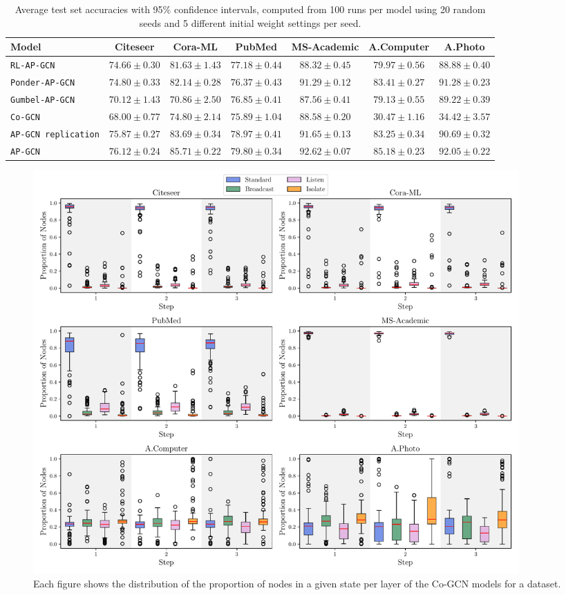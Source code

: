 \documentclass{gdl}
\begin{document}
\newpage
\onecolumn

\begin{table}[h]
    \small\sf\centering
    \caption{Average test set accuracies with 95\% confidence intervals, computed from 100 runs per model using 20 random seeds and 5 different initial weight settings per seed.}
    \begin{tabular}{l c c c c c c}
        \toprule
        Model & Citeseer & Cora-ML & PubMed & MS-Academic & A.Computer & A.Photo\\
        \midrule
        \texttt{RL-AP-GCN} &$74.66 \pm 0.30$&$81.63 \pm 1.43$&$77.18 \pm 0.44$&$88.32 \pm 0.45$&$79.97 \pm 0.56$&$88.88 \pm 0.40$   \\
        \texttt{Ponder-AP-GCN} &$74.80 \pm 0.33$&$82.14 \pm 0.28$&$76.37 \pm 0.43$&$91.29 \pm 0.12$&$83.41 \pm 0.27$&$91.28 \pm 0.23$  \\
        \texttt{Gumbel-AP-GCN} &$70.12 \pm 1.43$&$70.86 \pm 2.50$&$76.85 \pm 0.41$&$87.56 \pm 0.41$&$79.13 \pm 0.55$&$89.22 \pm 0.39$  \\
        \texttt{Co-GCN} &$68.00 \pm 0.77$&$74.80 \pm 2.14$&$75.89 \pm 1.04$&$88.58 \pm 0.20$&$30.47 \pm 1.16$&$34.42 \pm 3.57$  \\
        \texttt{AP-GCN replication} &$75.87 \pm 0.27$&$83.69 \pm 0.34$&$78.97 \pm 0.41$&$91.65 \pm 0.13$&$83.25 \pm 0.34$&$90.69 \pm 0.32$        \\
        \midrule
        \texttt{AP-GCN} & $76.12 \pm 0.24$ & $85.71 \pm 0.22$ & $79.80 \pm 0.34$ & $92.62 \pm 0.07$ & $85.18 \pm 0.23$ & $92.05 \pm 0.22$\\
        \bottomrule
    \end{tabular}
    \label{tab:accuracy}
\end{table}

\begin{figure}[h]
    \centering 
        \includegraphics[width=0.9\textwidth]{Cooperative-AP-GCN_state_distribution_per_step.pdf}
        \caption{Each figure shows the distribution of the proportion of nodes in a given state per layer of the Co-GCN models for a dataset.}
        \label{fig:cooperative-result} 
\end{figure}
\end{document}
